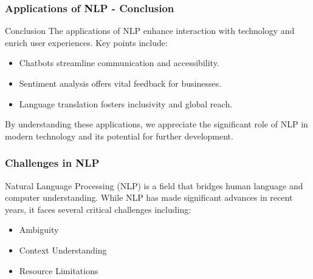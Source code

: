 \documentclass[aspectratio=169]{beamer}
\begin{document}
\begin{frame}[fragile]
    \frametitle{Applications of NLP - Conclusion}
    \begin{block}{Conclusion}
        The applications of NLP enhance interaction with technology and enrich user experiences. Key points include:
        \begin{itemize}
            \item Chatbots streamline communication and accessibility.
            \item Sentiment analysis offers vital feedback for businesses.
            \item Language translation fosters inclusivity and global reach.
        \end{itemize}
        By understanding these applications, we appreciate the significant role of NLP in modern technology and its potential for further development.
    \end{block}
\end{frame}

\begin{frame}[fragile]
    \frametitle{Challenges in NLP}
    Natural Language Processing (NLP) is a field that bridges human language and computer understanding. While NLP has made significant advances in recent years, it faces several critical challenges including:
    \begin{itemize}
        \item Ambiguity
        \item Context Understanding
        \item Resource Limitations
    \end{itemize}
\end{frame}
\end{document}
